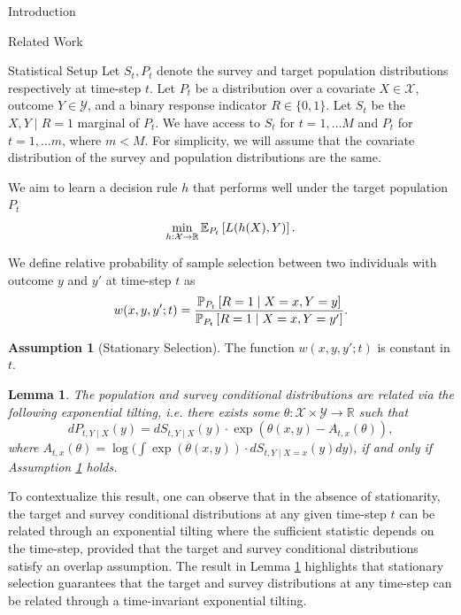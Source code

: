 \documentclass{article}
\theoremstyle{definition}
\newtheorem{assumption}{Assumption}
\theoremstyle{plain}
\newtheorem{lemm}[prop]{Lemma}
\theoremstyle{remark}
\begin{document}
\begin{section}{Introduction}
\begin{subsection}{Related Work}
  
 

  



\end{subsection}

\end{section}


\begin{section}{Statistical Setup}
Let $S_{t}, P_{t}$ denote the survey and target population distributions respectively at time-step $t.$ Let $P_{t}$ be a distribution over a covariate $X \in \mathcal{X}$, outcome $Y \in \mathcal{Y}$, and a binary response indicator $R \in \{0, 1\}.$ Let $S_{t}$ be the $X, Y \mid R=1$ marginal of $P_{t}$. We have access to $S_{t}$ for $t=1, \dots M$ and $P_{t}$ for $t=1, \dots m$, where $m < M$. For simplicity, we will assume that the covariate distribution of the survey and population distributions are the same.

We aim to learn a decision rule $h$ that performs well under the target population $P_{t}$
\begin{equation} 
\label{eq:erm}
\min_{h: \mathcal{X} \rightarrow \mathbb{R}} \EE[P_{t}]{L(h(X), Y)}. 
\end{equation}

We define relative probability of sample selection between two individuals with outcome $y$ and $y'$ at time-step $t$ as 
\begin{equation} w(x, y, y'; t) = \frac{\PP[P_{t}]{R=1 \mid X=x, Y=y}}{\PP[P_{t}]{R=1 \mid X=x, Y= y'}}.\end{equation}


\begin{assumption}[Stationary Selection]
\label{assumption:stationary_selection}
The function $w(x, y, y'; t)$ is constant in $t$.
\end{assumption}

\begin{lemm}
\label{lemm:equivalence}
The population and survey conditional distributions are related via the following exponential tilting, i.e. there exists some $\theta: \mathcal{X} \times \mathcal{Y} \rightarrow \mathbb{R}$ such that
\[dP_{t, Y \mid X}(y) = dS_{t, Y \mid X}(y) \cdot \exp(\theta(x, y) - A_{t, x}(\theta)),\] 
where $A_{t, x}(\theta) = \log\Big( \int \exp(\theta(x, y)) \cdot dS_{t, Y \mid X=x}(y) dy\Big)$, if and only if Assumption \ref{assumption:stationary_selection} holds.
\end{lemm}
To contextualize this result, one can observe that in the absence of stationarity, the target and survey conditional distributions at any given time-step $t$ can be related through an exponential tilting where the sufficient statistic depends on the time-step, provided that the target and survey conditional distributions satisfy an overlap assumption. The result in Lemma \ref{lemm:equivalence} highlights that stationary selection guarantees that the target and survey distributions at any time-step can be related through a time-invariant exponential tilting.


\end{section}
\end{document}
